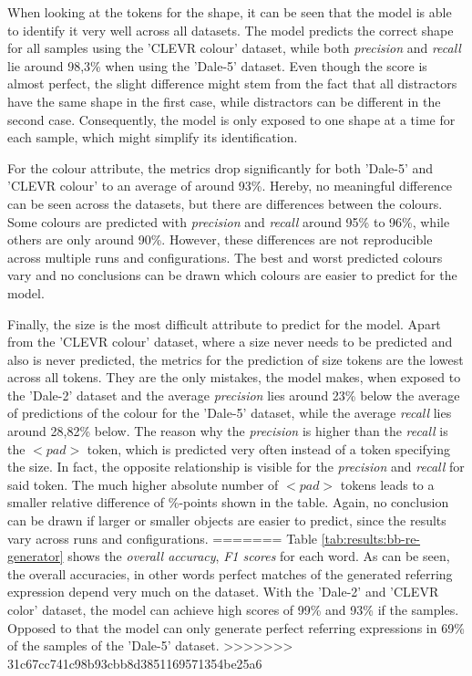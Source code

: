 \documentclass[11pt]{article}
\begin{document}
When looking at the tokens for the shape, it can be seen that the model is able to identify it very well across all datasets.
The model predicts the correct shape for all samples using the 'CLEVR colour' dataset, while both \emph{precision} and \emph{recall} lie around 98,3\% when using the 'Dale-5' dataset.
Even though the score is almost perfect, the slight difference might stem from the fact that all distractors have the same shape in the first case, while distractors can be different in the second case.
Consequently, the model is only exposed to one shape at a time for each sample, which might simplify its identification.

For the colour attribute, the metrics drop significantly for both 'Dale-5' and 'CLEVR colour' to an average of around 93\%.
Hereby, no meaningful difference can be seen across the datasets, but there are differences between the colours.
Some colours are predicted with \emph{precision} and \emph{recall} around 95\% to 96\%, while others are only around 90\%.
However, these differences are not reproducible across multiple runs and configurations.
The best and worst predicted colours vary and no conclusions can be drawn which colours are easier to predict for the model.

Finally, the size is the most difficult attribute to predict for the model.
Apart from the 'CLEVR colour' dataset, where a size never needs to be predicted and also is never predicted, the metrics for the prediction of size tokens are the lowest across all tokens.
They are the only mistakes, the model makes, when exposed to the 'Dale-2' dataset and the average \emph{precision} lies around 23\% below the average of predictions of the colour for the 'Dale-5' dataset, while the average \emph{recall} lies around 28,82\% below.
The reason why the \emph{precision} is higher than the \emph{recall} is the \emph{$<pad>$} token, which is predicted very often instead of a token specifying the size.
In fact, the opposite relationship is visible for the \emph{precision} and \emph{recall} for said token.
The much higher absolute number of \emph{$<pad>$} tokens leads to a smaller relative difference of \%-points shown in the table.
Again, no conclusion can be drawn if larger or smaller objects are easier to predict, since the results vary across runs and configurations.
=======
Table \ref{tab:results:bb-re-generator} shows the \emph{overall accuracy}, \emph{F1 scores} for each word.
As can be seen, the overall accuracies, in other words perfect matches of the generated referring expression depend very much on the dataset.
With the 'Dale-2' and 'CLEVR color' dataset, the model can achieve high scores of 99\% and 93\% if the samples.
Opposed to that the model can only generate perfect referring expressions in 69\% of the samples of the 'Dale-5' dataset.
>>>>>>> 31c67cc741c98b93cbb8d3851169571354be25a6
\end{document}
